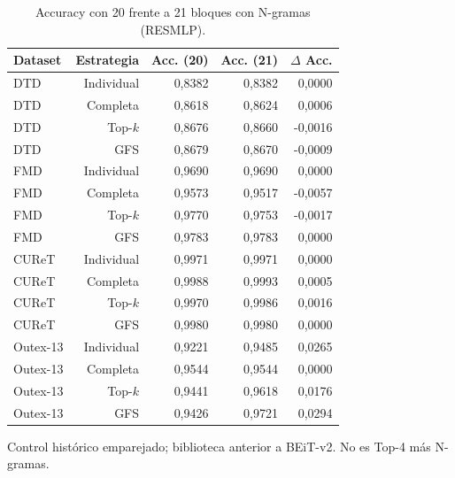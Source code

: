 \begin{table}[!htbp]\centering
\fontsize{8}{10}\selectfont\setlength{\tabcolsep}{4pt}
\caption{Accuracy con 20 frente a 21 bloques con N-gramas (RESMLP).}\label{tab:ngram-accuracy-resmlp}
\begin{tabular}{@{}lrrrr@{}}\toprule
Dataset & Estrategia & Acc. (20) & Acc. (21) & $\Delta$ Acc.\\\midrule
DTD & Individual & 0,8382 & 0,8382 & 0,0000\\
DTD & Completa & 0,8618 & 0,8624 & 0,0006\\
DTD & Top-$k$ & 0,8676 & 0,8660 & -0,0016\\
DTD & GFS & 0,8679 & 0,8670 & -0,0009\\
FMD & Individual & 0,9690 & 0,9690 & 0,0000\\
FMD & Completa & 0,9573 & 0,9517 & -0,0057\\
FMD & Top-$k$ & 0,9770 & 0,9753 & -0,0017\\
FMD & GFS & 0,9783 & 0,9783 & 0,0000\\
CUReT & Individual & 0,9971 & 0,9971 & 0,0000\\
CUReT & Completa & 0,9988 & 0,9993 & 0,0005\\
CUReT & Top-$k$ & 0,9970 & 0,9986 & 0,0016\\
CUReT & GFS & 0,9980 & 0,9980 & 0,0000\\
Outex-13 & Individual & 0,9221 & 0,9485 & 0,0265\\
Outex-13 & Completa & 0,9544 & 0,9544 & 0,0000\\
Outex-13 & Top-$k$ & 0,9441 & 0,9618 & 0,0176\\
Outex-13 & GFS & 0,9426 & 0,9721 & 0,0294\\
\bottomrule\end{tabular}
\par\smallskip\begin{minipage}{0.98\textwidth}\footnotesize Control histórico emparejado; biblioteca anterior a BEiT-v2. No es Top-4 más N-gramas.\end{minipage}
\end{table}
